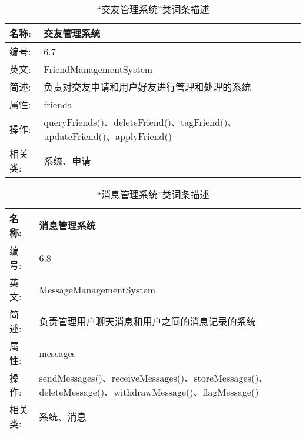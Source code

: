 \begin{table}[H]  
\caption{“交友管理系统”类词条描述}  
\begin{center}  
    \begin{tabular}{l p{11cm}} 
        \hline
        \quad 名称:  &  交友管理系统 \\
        \hline
        \quad 编号:  & 6.7 \\
        \hline
        \quad 英文:  &  FriendManagementSystem \\
        \hline
        \quad 简述:  & 负责对交友申请和用户好友进行管理和处理的系统 \\
        \hline
        \quad 属性:  & friends\\
        \hline
        \quad 操作:  & queryFriends()、deleteFriend()、tagFriend()、updateFriend()、applyFriend()\\
        \hline
        \quad 相关类:  & 系统、申请 \\
        \hline
    \end{tabular}
\end{center}
\end{table}

\begin{table}[H]  
\caption{“消息管理系统”类词条描述}  
\begin{center}  
    \begin{tabular}{l p{11cm}} 
        \hline
        \quad 名称:  &  消息管理系统 \\
        \hline
        \quad 编号:  & 6.8 \\
        \hline
        \quad 英文:  &  MessageManagementSystem \\
        \hline
        \quad 简述:  & 负责管理用户聊天消息和用户之间的消息记录的系统 \\
        \hline
        \quad 属性:  & messages\\
        \hline
        \quad 操作:  & sendMessages()、receiveMessages()、storeMessages()、deleteMessage()、withdrawMessage()、flagMessage()\\
        \hline
        \quad 相关类:  & 系统、消息 \\
        \hline
    \end{tabular}
\end{center}
\end{table}

